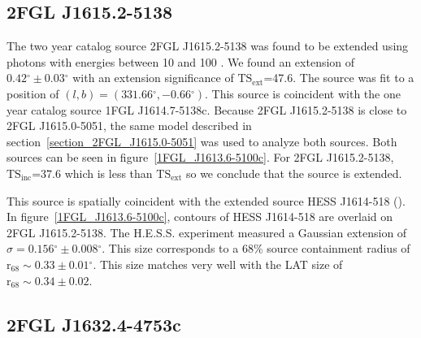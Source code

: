 \documentclass[12pt,preprint]{aastex}
\newcommand{\gev}{\text{GeV}\xspace}
\newcommand{\tev}{\text{TeV}\xspace}
\newcommand{\tsext}{{\ensuremath{\text{TS}_\text{ext}}}\xspace}
\newcommand{\tsinc}{\ensuremath{\text{TS}_\text{inc}}\xspace}
\newcommand{\rsixeight}{{\ensuremath{\text{r}_{68}}}\xspace}
\renewcommand{\deg}{\ensuremath{^\circ}\xspace}
\begin{document}

\subsection{2FGL J1615.2-5138}
\label{section_2FGL_J1615.2-5138}

The two year catalog source 2FGL J1615.2-5138 was found to be
extended using photons with energies between 10 \gev and 100 \gev.
We found an extension of $0.42\deg\pm0.03\deg$ with an extension
significance of \tsext=47.6.  The source was fit to a position
of $(l,b)=(331.66\deg,-0.66\deg)$.  This source is coincident
with the one year catalog source 1FGL J1614.7-5138c.  Because 2FGL
J1615.2-5138 is close to 2FGL J1615.0-5051, the same model described
in section~\ref{section_2FGL_J1615.0-5051} was used to analyze both
sources. Both sources can be seen in figure~\ref{1FGL_J1613.6-5100c}.
For 2FGL J1615.2-5138, \tsinc=37.6 which is less than \tsext so we
conclude that the source is extended.

This source is spatially coincident with the extended \tev source
HESS J1614-518 (\cite{HESS_plane_survey}). In figure~\ref{1FGL_J1613.6-5100c},
contours of HESS J1614-518 are overlaid on 2FGL J1615.2-5138.  The H.E.S.S. experiment measured a Gaussian extension of
$\sigma=0.156\deg\pm0.008\deg$. This size corresponds to a 68\% source
containment radius of $\rsixeight\sim0.33\pm0.01\deg$.  This size matches
very well with the LAT size of $\rsixeight\sim0.34\pm0.02$.



\subsection{2FGL J1632.4-4753c}
\label{section_2FGL_J1632.4-4753c}


\end{document}
